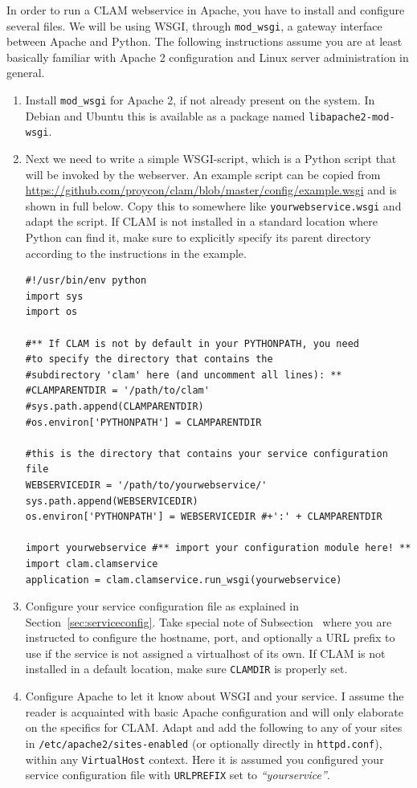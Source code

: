\documentclass[a4paper,12pt]{report}
\begin{document}
In order to run a CLAM webservice in Apache, you have to install and configure
several files. We will be using WSGI, through \texttt{mod\_wsgi}, a gateway interface
between Apache and Python. The following instructions assume you are at least
basically familiar with Apache 2 configuration and Linux server administration
in general.

\begin{enumerate}
    \item Install \texttt{mod\_wsgi} for Apache 2, if not already
    present on the system. In Debian and Ubuntu this is available as a package
    named \texttt{libapache2-mod-wsgi}.  
  
    \item Next we need to write a simple
    WSGI-script, which is a Python script that will be invoked by the
    webserver. An example script can be copied from
    \url{https://github.com/proycon/clam/blob/master/config/example.wsgi} and
    is shown in full below. Copy this to somewhere like
    \texttt{yourwebservice.wsgi} and adapt the script. If CLAM is not installed in a standard location
    where Python can find it, make sure to explicitly specify its parent
    directory according to the instructions in the example.

\begin{verbatim}
#!/usr/bin/env python
import sys
import os

#** If CLAM is not by default in your PYTHONPATH, you need 
#to specify the directory that contains the
#subdirectory 'clam' here (and uncomment all lines): **
#CLAMPARENTDIR = '/path/to/clam' 
#sys.path.append(CLAMPARENTDIR)
#os.environ['PYTHONPATH'] = CLAMPARENTDIR

#this is the directory that contains your service configuration file
WEBSERVICEDIR = '/path/to/yourwebservice/' 
sys.path.append(WEBSERVICEDIR)
os.environ['PYTHONPATH'] = WEBSERVICEDIR #+':' + CLAMPARENTDIR

import yourwebservice #** import your configuration module here! **
import clam.clamservice
application = clam.clamservice.run_wsgi(yourwebservice)
\end{verbatim}
 
\item Configure your service configuration file as explained in
  Section~\ref{sec:serviceconfig}. Take special note of
  Subsection~\label{sec:sadmin} where you are instructed to configure the
  hostname, port, and optionally a URL prefix to use if the service is not
  assigned a virtualhost of its own. If CLAM is not installed in a default
  location, make sure \texttt{CLAMDIR} is properly set.
\item Configure Apache to let it know about WSGI and your service. I assume the
  reader is acquainted with basic Apache configuration and will only elaborate
  on the specifics for CLAM. Adapt and add the following to any of your sites
  in \texttt{/etc/apache2/sites-enabled} (or optionally directly in
  \texttt{httpd.conf}), within any \texttt{VirtualHost} context. Here it is
  assumed you configured your service configuration file with
  \texttt{URLPREFIX} set to \emph{``yourservice''}.


\end{enumerate}
\end{document}
